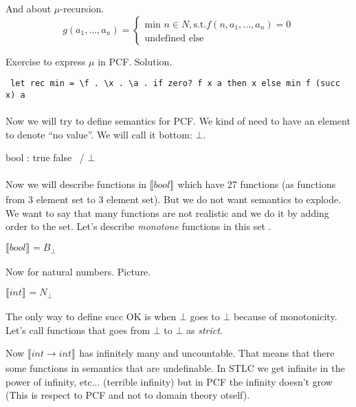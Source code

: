 \documentclass[a4paper,10pt]{book}
\newcommand{\sem}[2]{ \llbracket#1\rrbracket_{#2} }
\newcommand{\rarr}{ \rightarrow }
\begin{document}
And about $\mu$-recursion.
 \[
    g(a_1,...,a_n)=\left\{
                \begin{array}{ll}
                  \text{min } n\in N, \text{s.t.} f(n,a_1,...,a_n)=0\\
                  \text{undefined else}
                \end{array}
              \right.
  \]
  
  
  

Exercise to express $\mu$ in PCF.
Solution.
\begin{verbatim}
 let rec min = \f . \x . \a . if zero? f x a then x else min f (succ x) a
\end{verbatim}

\paragraph{}
Now we will try to define semantics for PCF.
We kind of need to have an element to denote ``no value''. We will call it bottom: $\bot$.

bool :   true  false
           \    /
            $\bot$
            
\paragraph{}
Now we will describe functions in $\sem{bool}{}$ which have 27 functions (as functions from 3
element set to 3 element set). But we do not want semantics to explode. We want to say that 
many functions are not realistic and we do it by adding order to the set. Let's describe 
\textit{monotone} functions in this set .


$\sem{bool}{} = B_\bot$

Now for natural numbers. Picture.

$\sem{int}{} = N_\bot$ 

The only way to define succ OK is when $\bot$ goes to $\bot$ because of monotonicity. Let's call
functions that goes from $\bot$ to $\bot$ as \textit{strict}.

Now 
$\sem{int \rarr int}{}$ has infinitely many and uncountable. That means that there some functions
in semantics that are undefinable. In STLC we get infinite in the power of infinity, etc... (terrible 
infinity) but in PCF the infinity doesn't grow (This is respect to PCF and not to domain theory otself).
\end{document}
